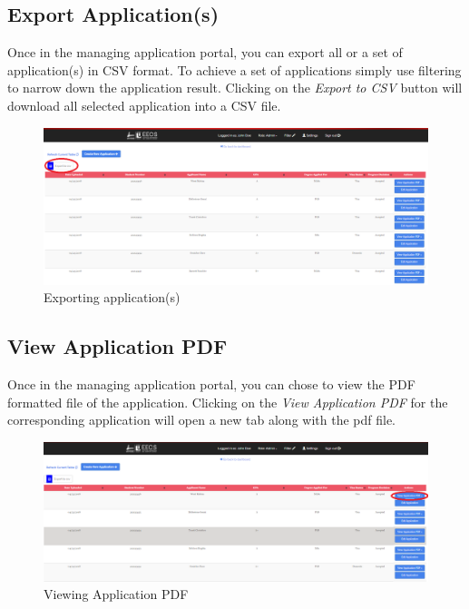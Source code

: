 \documentclass[fontsize=12pt,paper=letter,twoside]{scrartcl}
\begin{document}
\clearpage
\subsection{Export Application(s)}
Once in the managing application portal, you can export all or a set of application(s) in CSV format. To achieve a set of applications simply use filtering to narrow down the application result. Clicking on the \emph{Export to CSV} button will download all selected application into a CSV file.

\begin{figure}[!htb]
\begin{center}
\includegraphics[width=.99\textwidth]{images/ma/export_appl.png}
\end{center}
\caption{Exporting application(s)}
\label{fig:export_appl}
\end{figure}

\clearpage
\subsection{View Application PDF}
Once in the managing application portal, you can chose to view the PDF formatted file of the application. Clicking on the \emph{View Application PDF} for the corresponding application will open a new tab along with the pdf file.

\begin{figure}[!htb]
\begin{center}
\includegraphics[width=.9\textwidth]{images/ma/view_appl_app.png}
\end{center}
\caption{Viewing Application PDF}
\label{fig:view_appl_app}
\end{figure}
\end{document}

